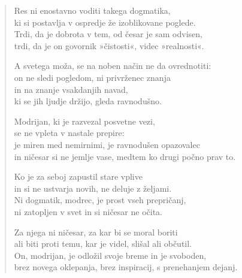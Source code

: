 \begin{verse}
Res ni enostavno voditi takega dogmatika,\\
ki si postavlja v ospredje že izoblikovane poglede.\\
Trdi, da je dobrota v tem, od česar je sam odvisen,\\
trdi, da je on govornik »čistosti«, videc »realnosti«.

A svetega moža, se na noben način ne da ovrednotiti:\\
on ne sledi pogledom, ni privrženec znanja\\
in na znanje vsakdanjih navad,\\
ki se jih ljudje držijo, gleda ravnodušno.

Modrijan, ki je razvezal posvetne vezi,\\
se ne vpleta v nastale prepire:\\
je miren med nemirnimi, je ravnodušen opazovalec\\
in ničesar si ne jemlje vase, medtem ko drugi počno prav to.

Ko je za seboj zapustil stare vplive\\
in si ne ustvarja novih, ne deluje z željami.\\
Ni dogmatik, modrec, je prost vseh prepričanj,\\
ni zatopljen v svet in si ničesar ne očita.

Za njega ni ničesar, za kar bi se moral boriti\\
ali biti proti temu, kar je videl, slišal ali občutil.\\
On, modrijan, je odložil svoje breme in je svoboden,\\
brez novega oklepanja, brez inspiracij, s prenehanjem dejanj.

\end{verse}


\clearpage
\begin{verse}


\end{verse}


\clearpage
\begin{verse}


\end{verse}

